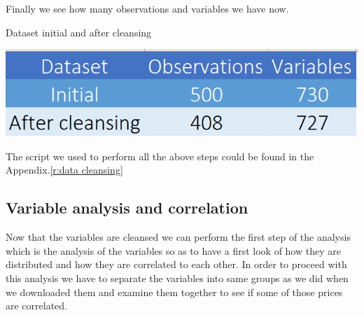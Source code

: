 \documentclass{book}
\begin{document}
Finally we see how many observations and variables we have now.
\begin{table}[H]
\centering
\caption{Dataset initial and after cleansing}
\includegraphics[scale=0.6]{../R/photos/002_dataset.PNG} 
\end{table}
The script we used to perform all the above steps could be found in the Appendix.\ref{r:data cleansing}
\subsection{Variable analysis and correlation}
Now that the variables are cleansed we can perform the first step of the analysis which is the analysis of the variables so as to have a first look of how they are distributed and how they are correlated to each other. In order to proceed with this analysis we have to separate the variables into same groups as we did when we downloaded them and examine them together to see if some of those prices are correlated.
\end{document}

